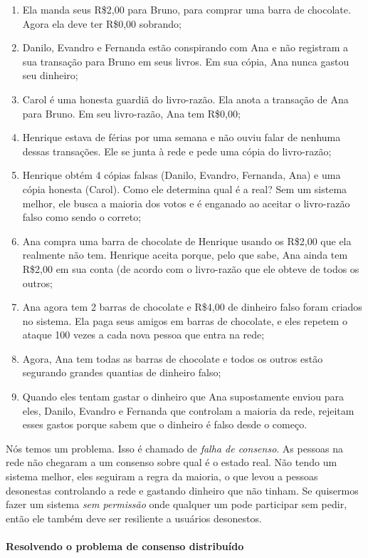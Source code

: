 \begin{enumerate}
\item Ela manda seus R\$2,00 para Bruno, para comprar uma barra de chocolate. Agora ela deve ter R\$0,00 sobrando;
\item Danilo, Evandro e Fernanda estão conspirando com Ana e não registram a sua transação para Bruno em seus livros. Em sua cópia, Ana nunca gastou seu dinheiro;
\item Carol é uma honesta guardiã do livro-razão. Ela anota a transação de Ana para Bruno. Em seu livro-razão, Ana tem R\$0,00;
\item Henrique estava de férias por uma semana e não ouviu falar de nenhuma dessas transações. Ele se junta à rede e pede uma cópia do livro-razão;
\item Henrique obtém 4 cópias falsas (Danilo, Evandro, Fernanda, Ana) e uma cópia honesta (Carol). Como ele determina qual é a real? Sem um sistema melhor, ele busca a maioria dos votos e é enganado ao aceitar o livro-razão falso como sendo o correto;
\item Ana compra uma barra de chocolate de Henrique usando os R\$2,00 que ela realmente não tem. Henrique aceita porque, pelo que sabe, Ana ainda tem R\$2,00 em sua conta (de acordo com o livro-razão que ele obteve de todos os outros;
\item Ana agora tem 2 barras de chocolate e R\$4,00 de dinheiro falso foram criados no sistema. Ela paga seus amigos em barras de chocolate, e eles repetem o ataque 100 vezes a cada nova pessoa que entra na rede;
\item Agora, Ana tem todas as barras de chocolate e todos os outros estão segurando grandes quantias de dinheiro falso;
\item Quando eles tentam gastar o dinheiro que Ana supostamente enviou para eles, Danilo, Evandro e Fernanda que controlam a maioria da rede, rejeitam esses gastos porque sabem que o dinheiro é falso desde o começo.
\end{enumerate}

Nós temos um problema. Isso é chamado de \textit{falha de consenso}. As pessoas na rede não chegaram a um consenso sobre qual é o estado real. Não tendo um sistema melhor, eles seguiram a regra da maioria, o que levou a pessoas desonestas controlando a rede e gastando dinheiro que não tinham.
Se quisermos fazer um sistema \textit{sem permissão} onde qualquer um pode participar sem pedir, então ele também deve ser resiliente a usuários desonestos.

\paragraph{Resolvendo o problema de consenso distribuído}
